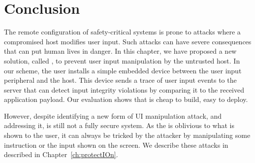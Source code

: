 
\section{Conclusion}
\label{sec:conclusion_IK}

The remote configuration of safety-critical systems is prone to attacks where a compromised host modifies user input. Such attacks can have severe consequences that can put human lives in danger. In this chapter, we have proposed a new solution, called \name, to prevent user input manipulation by the untrusted host. In our scheme, the user installs a simple embedded device between the user input peripheral and the host. This device sends a trace of user input events to the server that can detect input integrity violations by comparing it to the received application payload. Our evaluation shows that \name is cheap to build, easy to deploy.

However, despite identifying a new form of UI manipulation attack, and addressing it, \integrikey is still not a fully secure system. As the \device is oblivious to what is shown to the user, it can always be tricked by the attacker by manipulating some instruction or the input shown on the screen. We describe these attacks in \protection described in Chapter~\ref{ch:protectIOn}.
